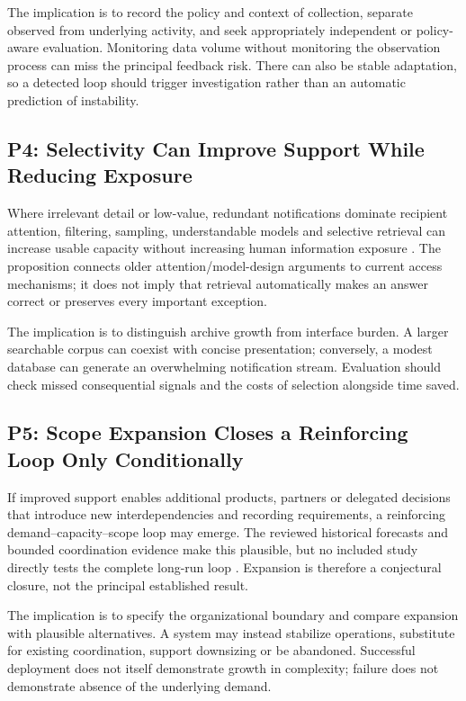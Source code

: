 \documentclass[journal]{IEEEtran}
\begin{document}
The implication is to record the policy and context of collection, separate observed from underlying activity, and seek appropriately independent or policy-aware evaluation. Monitoring data volume without monitoring the observation process can miss the principal feedback risk. There can also be stable adaptation, so a detected loop should trigger investigation rather than an automatic prediction of instability.

\subsection{P4: Selectivity Can Improve Support While Reducing Exposure}
Where irrelevant detail or low-value, redundant notifications dominate recipient attention, filtering, sampling, understandable models and selective retrieval can increase usable capacity without increasing human information exposure \cite{SIMON1971,little1969,gorry1971,Lewis2020}. The proposition connects older attention/model-design arguments to current access mechanisms; it does not imply that retrieval automatically makes an answer correct or preserves every important exception.

The implication is to distinguish archive growth from interface burden. A larger searchable corpus can coexist with concise presentation; conversely, a modest database can generate an overwhelming notification stream. Evaluation should check missed consequential signals and the costs of selection alongside time saved.

\subsection{P5: Scope Expansion Closes a Reinforcing Loop Only Conditionally}
If improved support enables additional products, partners or delegated decisions that introduce new interdependencies and recording requirements, a reinforcing demand--capacity--scope loop may emerge. The reviewed historical forecasts and bounded coordination evidence make this plausible, but no included study directly tests the complete long-run loop \cite{shim2002,amershi2019}. Expansion is therefore a conjectural closure, not the principal established result.

The implication is to specify the organizational boundary and compare expansion with plausible alternatives. A system may instead stabilize operations, substitute for existing coordination, support downsizing or be abandoned. Successful deployment does not itself demonstrate growth in complexity; failure does not demonstrate absence of the underlying demand.
\end{document}

